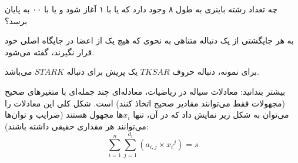 \documentclass[
    11pt,
    largemargins,
    twoside,
    template_root=../,
    reference_icons=./Icons,
]{../BOOK}
\begin{document}
            \begin{PROBLEM}
                \p
                چه تعداد رشته باینری به طول ۸ وجود دارد که یا با ۱ آغاز شود و یا با ۰۰ به پایان برسد؟
            
            \end{PROBLEM}


                \begin{DEFINITION}
                    \p
                    به هر جایگشتی از یک دنباله متناهی به نحوی که هیچ یک از اعضا در
                    جایگاه اصلی خود قرار نگیرند،
                    گفته می‌شود.
                \end{DEFINITION}

                \p
                برای نمونه،
                دنباله حروف
                $TKSAR$
                یک پریش برای دنباله
                $STARK$
                می‌باشد.

                \begin{EXTRA}{بیشتر بندانید: معادلات سیاله}
                    \p
                    در ریاضیات،
                    معادله‌ای چند جمله‌ای با متغیرهای صحیح
                    (مجهولات فقط می‌توانند مقادیر صحیح اتخاذ کنند)
                    است. شکل کلی این معادلات را می‌توان به شکل زیر نمایش داد
                    که در آن، تنها ‌$x_i$ها مجهول هستند
                    (ضرایب و توان‌ها می‌توانند هر مقداری حقیقی داشته باشند): 
                    $$\sum\limits_{i=1}^{n} \sum\limits_{j=1}^{d_i} ({a_{i,j}} \times {x_i}^{j}) = s$$
                \end{EXTRA}
\end{document}
